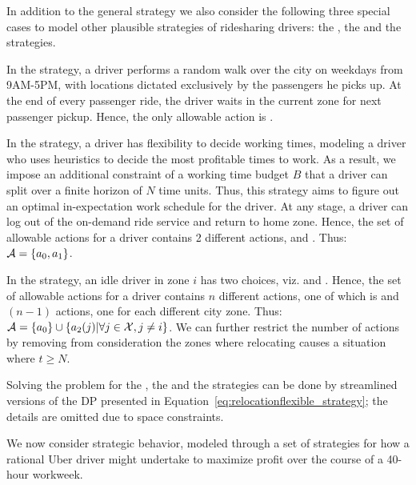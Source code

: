 { In addition to the general {\relocationflexible} strategy we also
consider the following three special cases to model other plausible strategies of ridesharing drivers: 
the {\naive}, the {\relocation} and the {\flexible} strategies.

In the {\naive} strategy, a driver performs a random walk over the city on weekdays from 9AM-5PM, with locations dictated exclusively 
by the passengers he picks up. At the end of every passenger ride, the driver waits in the current zone for next passenger pickup. 
Hence, the only allowable action is {\getpassenger}.


In the {\flexible} strategy, a driver has flexibility to decide working times, modeling a driver who uses heuristics to decide the most profitable times to work.   As a result, we impose an additional constraint of a working time budget $B$ that a driver can split over a finite horizon of $N$ time units. Thus, this strategy aims to figure out an optimal 
in-expectation work schedule for the driver.  
At any stage, a driver can log out of the on-demand ride service and return to home zone. Hence, the set of allowable actions for a driver contains 2 different actions, {\getpassenger} and {\gohome}.  Thus: $
\mathcal{A} = \{a_0, a_1\}$.

In the {\relocation} strategy, an idle driver in zone $i$ has two choices, viz. {\getpassenger} and {\relocate}. Hence, the set of allowable actions for a driver contains $n$ different actions, one of which is {\getpassenger} and $(n-1)$ {\relocate} actions, one for each different city zone.  Thus: $
\mathcal{A} =  \{a_0\} \cup \{a_2(j) | \forall j \in \mathcal{X}, j \neq i \}
$.
We can further restrict the number of {\relocate} actions by removing from consideration the zones where relocating causes a situation where $t \geq N$.

Solving the {\originalproblem} problem for the {\naive}, the {\relocation} and the
{\flexible} strategies can be done by streamlined versions of the DP presented in 
Equation~\eqref{eq:relocationflexible_strategy}; the details
are omitted due to space constraints.


\iffalse
We now consider strategic behavior, modeled through a set of strategies for how 
a rational Uber driver might undertake to maximize profit over the course of a 
40-hour workweek.  

}

